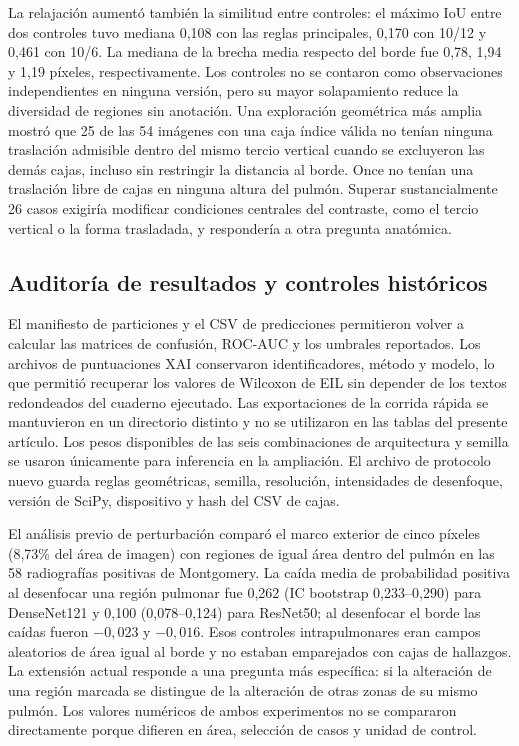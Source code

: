 \documentclass[conference]{IEEEtran}
\begin{document}
La relajación aumentó también la similitud entre controles: el máximo IoU entre dos controles tuvo mediana 0,108 con las reglas principales, 0,170 con 10/12 y 0,461 con 10/6. La mediana de la brecha media respecto del borde fue 0,78, 1,94 y 1,19 píxeles, respectivamente. Los controles no se contaron como observaciones independientes en ninguna versión, pero su mayor solapamiento reduce la diversidad de regiones sin anotación. Una exploración geométrica más amplia mostró que 25 de las 54 imágenes con una caja índice válida no tenían ninguna traslación admisible dentro del mismo tercio vertical cuando se excluyeron las demás cajas, incluso sin restringir la distancia al borde. Once no tenían una traslación libre de cajas en ninguna altura del pulmón. Superar sustancialmente 26 casos exigiría modificar condiciones centrales del contraste, como el tercio vertical o la forma trasladada, y respondería a otra pregunta anatómica.

\subsection{Auditoría de resultados y controles históricos}
El manifiesto de particiones y el CSV de predicciones permitieron volver a calcular las matrices de confusión, ROC-AUC y los umbrales reportados. Los archivos de puntuaciones XAI conservaron identificadores, método y modelo, lo que permitió recuperar los valores de Wilcoxon de EIL sin depender de los textos redondeados del cuaderno ejecutado. Las exportaciones de la corrida rápida se mantuvieron en un directorio distinto y no se utilizaron en las tablas del presente artículo. Los pesos disponibles de las seis combinaciones de arquitectura y semilla se usaron únicamente para inferencia en la ampliación. El archivo de protocolo nuevo guarda reglas geométricas, semilla, resolución, intensidades de desenfoque, versión de SciPy, dispositivo y hash del CSV de cajas.

El análisis previo de perturbación comparó el marco exterior de cinco píxeles (8,73\% del área de imagen) con regiones de igual área dentro del pulmón en las 58 radiografías positivas de Montgomery. La caída media de probabilidad positiva al desenfocar una región pulmonar fue 0,262 (IC bootstrap 0,233--0,290) para DenseNet121 y 0,100 (0,078--0,124) para ResNet50; al desenfocar el borde las caídas fueron $-0,023$ y $-0,016$. Esos controles intrapulmonares eran campos aleatorios de área igual al borde y no estaban emparejados con cajas de hallazgos. La extensión actual responde a una pregunta más específica: si la alteración de una región marcada se distingue de la alteración de otras zonas de su mismo pulmón. Los valores numéricos de ambos experimentos no se compararon directamente porque difieren en área, selección de casos y unidad de control.
\end{document}

